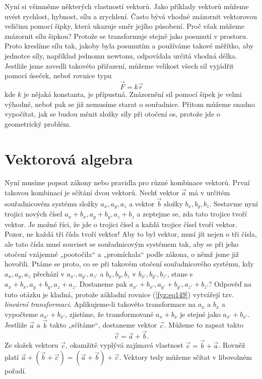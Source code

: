    Nyní si všimněme některých vlastností vektorů. Jako příklady vektorů můžeme uvést rychlost, 
    hybnost, sílu a zrychlení. Často bývá vhodné znázornit vektorovou veličinu pomocí šipky, která 
    ukazuje směr jejího působení. Proč však můžeme znázornit sílu šipkou? Protože se transformuje 
    stejně jako posunutí v prostoru. Proto kreslíme sílu tak, jakoby byla posunutím a používáme 
    takové měřítko, aby jednotce síly, například jednomu newtonu, odpovídala určitá vhodná délka. 
    Jestliže jsme zavedli takovéto přiřazení, můžeme velikost všech sil vyjádřit pomocí úseček, 
    neboť rovnice typu
    \begin{equation*}
     \vec{F} = k\vec{r}
    \end{equation*}
    kde \(k\) je nějaká konstanta, je přípustná. Znázornění sil pomocí šipek je velmi výhodné, 
    neboť pak se již nemusíme starat o souřadnice. Přitom můžeme snadno vypočítat, jak se budou 
    měnit složky síly při otočení os, protože jde o geometrický problém.
    
  \section{Vektorová algebra}
    Nyní musíme popsat zákony nebo pravidla pro různé kombinace vektorů. První takovou kombinací je 
    sčítání dvou vektorů. Nechť vektor \(\vec{a}\) má v určitém souřadnicovém systému složky \(a_x, 
    a_y, a_z\) a vektor \(\vec{b}\) složky \(b_x, b_y, b_z\). Sestavme nyní trojici nových čísel 
    \(a_x + b_x, a_y + b_y, a_z + b_z\) a zeptejme se, zda tato trojice tvoří vektor. Je možné 
    říci, že jde o trojici čísel a každá trojice čísel tvoří vektor. Pozor, ne každá tři čísla 
    tvoří vektor! Aby to byl vektor, musí jít nejen o tři čísla, ale tato čísla musí souviset se 
    souřadnicovým systémem tak, aby se při jeho otočení vzájemné „pootočila“ a „promíchala“ podle 
    zákona, o němž jsme již hovořili. Ptáme se proto, co se při takovém otočení souřadnicového 
    systému, kdy \(a_x, a_y, a_z\) přechází v \(a_{x'}, a_{y'}, a_{z'}\) a \(b_x, b_y, b_z\) v 
    \(b_{x'}, b_{y'}, b_{z'}\), stane s \(a_x + b_x, a_y + b_y, a_z + a_z\). Dostaneme pak \(a_{x'} 
    + b_{x'}, a_{y'} + b_{y'}, a_{z'} + b_{z'}\)? Odpověď na tuto otázku je kladná, protože 
    základní rovnice (\ref{fyz:eq149}) vytvářejí tzv. \emph{lineární transformaci}. Aplikujeme-li 
    takovéto transformace na \(a_x\) a \(b_x\) a vypočteme \(a_{x'} + b_{x'}\), zjistíme, že 
    transformované \(a_x + b_x\) je stejné jako \(a_{x'} + b_{x'}\). Jestliže \(\vec{a}\) a 
    \(\vec{b}\) takto „sčítáme“, dostaneme vektor \(\vec{c}\). Můžeme to zapsat takto
    \begin{equation*}
     \vec{c} = \vec{a} + \vec{b}.
    \end{equation*}
    Ze složek vektoru \(\vec{c}\), okamžitě vyplývá zajímavá vlastnost \(\vec{c} = \vec{b} + 
    \vec{a}\). Rovněž platí \(\vec{a} + (\vec{b} + \vec{c}) = (\vec{a} + \vec{b}) + \vec{c}\). 
    Vektory tedy můžeme sčítat v libovolném pořadí.
    
